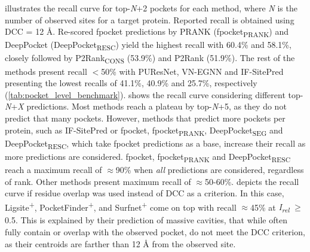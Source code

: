  illustrates the recall curve for top-\textit{N}+2 pockets for each method, where \textit{N} is the number of observed sites for a target protein. Reported recall is obtained using DCC = 12 \AA{}. Re-scored fpocket predictions by PRANK (fpocket\textsubscript{PRANK}) and DeepPocket (DeepPocket\textsubscript{RESC}) yield the highest recall with 60.4\% and 58.1\%, closely followed by P2Rank\textsubscript{CONS} (53.9\%) and P2Rank (51.9\%). The rest of the methods present recall $<$50\% with PUResNet, VN-EGNN and IF-SitePred presenting the lowest recalls of 41.1\%, 40.9\% and 25.7\%, respectively (\autoref{tab:pocket_level_benchmark}).  shows the recall curve considering different top-\textit{N}+\textit{X} predictions. Most methods reach a plateau by top-\textit{N}+5, as they do not predict that many pockets. However, methods that predict more pockets per protein, such as IF-SitePred or fpocket, fpocket\textsubscript{PRANK}, DeepPocket\textsubscript{SEG} and DeepPocket\textsubscript{RESC}, which take fpocket predictions as a base, increase their recall as more predictions are considered. fpocket, fpocket\textsubscript{PRANK} and DeepPocket\textsubscript{RESC} reach a maximum recall of $\approx$90\% when \textit{all} predictions are considered, regardless of rank. Other methods present maximum recall of $\approx$50-60\%.  depicts the recall curve if residue overlap was used instead of DCC as a criterion. In this case, Ligsite\textsuperscript{+}, PocketFinder\textsuperscript{+}, and Surfnet\textsuperscript{+} come on top with recall $\approx$45\% at \textit{I\textsubscript{rel}} $\geq$ 0.5. This is explained by their prediction of massive cavities, that while often fully contain or overlap with the observed pocket, do not meet the DCC criterion, as their centroids are farther than 12 \AA{} from the observed site.

